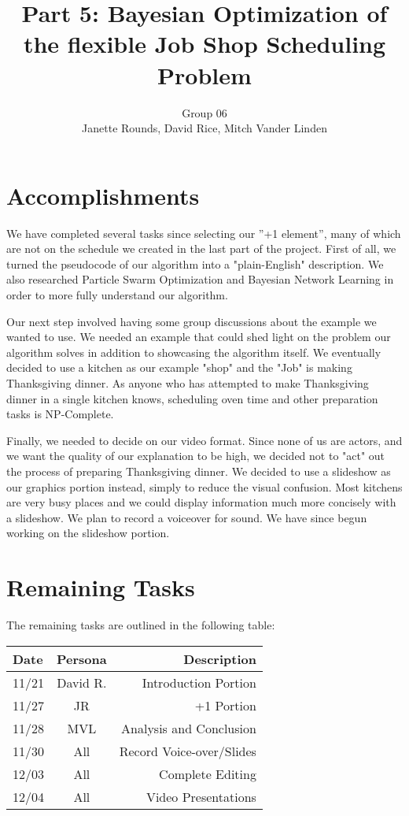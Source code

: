 \documentclass[11pt,twocolumn]{article}
\title{Part 5: Bayesian Optimization of the flexible Job Shop Scheduling Problem}
\author{Group 06 \\ 
\small Janette Rounds, \small David Rice, \small Mitch Vander Linden}
\begin{document}
	\section{Accomplishments}
	
	We have completed several tasks since selecting our ''+1 element'', many of which are not on the schedule we created in the last part of the project. First of all, we turned the pseudocode of our algorithm into a "plain-English" description. We also researched Particle Swarm Optimization and Bayesian Network Learning in order to more fully understand our algorithm. 
	
	Our next step involved having some group discussions about the example we wanted to use. We needed an example that could shed light on the problem our algorithm solves in addition to showcasing the algorithm itself. We eventually decided to use a kitchen as our example "shop" and the "Job" is making Thanksgiving dinner. As anyone who has attempted to make Thanksgiving dinner in a single kitchen knows, scheduling oven time and other preparation tasks is NP-Complete. 
	
	Finally, we needed to decide on our video format. Since none of us are actors, and we want the quality of our explanation to be high, we decided not to "act" out the process of preparing Thanksgiving dinner. We decided to use a slideshow as our graphics portion instead, simply to reduce the visual confusion. Most kitchens are very busy places and we could display information much more concisely with a slideshow. We plan to record a voiceover for sound. We have since begun working on the slideshow portion. 
	
	\section{Remaining Tasks}
	The remaining tasks are outlined in the following table:
	
	\begin{table}[h!]
	\centering
	\begin{tabular}{ |l | c | r|}
	  \hline
	  Date & Persona & Description \\
	  \hline
	  \hline
	  11/21 & David R. & Introduction Portion \\
	  \hline
	  11/27 & JR & +1 Portion \\
	  \hline
	  11/28 & MVL & Analysis and Conclusion \\
	  \hline
	  11/30 & All & Record Voice-over/Slides \\
	  \hline
	  12/03 & All & Complete Editing \\
	  \hline
	  12/04 & All & Video Presentations \\
	  \hline
	\end{tabular}
	\end{table}
	
\end{document}
